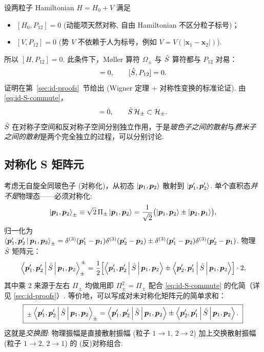 设两粒子 Hamiltonian $H=H_0+V$ 满足
\begin{itemize}
  \item $[H_0,P_{12}]=0$ (动能项天然对称, 自由 Hamiltonian 不区分粒子标号)；
  \item $[V,P_{12}]=0$ (势 $V$ 不依赖于人为标号，例如 $V=V(|\bm x_1-\bm x_2|)$).
\end{itemize}
所以 $[H,P_{12}]=0$. 此条件下，Møller 算符 $\Omega_\pm$ 与 $\hat{S}$ 算符都与 $P_{12}$ 对易：
\begin{equation}
  [\Omega_\pm,P_{12}]=0,\qquad [\Smat,P_{12}]=0.
  \label{eq:id-S-commute}
\end{equation}
证明在第~\ref{sec:id-proofs}~节给出 (Wigner 定理 + 对称性变换的标准论证). 由 \eqref{eq:id-S-commute}，
\begin{equation}
  [\Smat,\Pi_\pm]=0,\qquad
  \Smat\,\Hilb_\pm\subset\Hilb_\pm.
  \label{eq:id-S-invariant}
\end{equation}
$\hat{S}$ 在对称子空间和反对称子空间分别独立作用，于是\emph{玻色子之间的散射}与\emph{费米子之间的散射}是两个完全独立的过程，可以分别讨论.

\subsection{对称化 S 矩阵元}\label{sec:id-sym-S}

考虑无自旋全同玻色子 (对称化)，从初态 $\ket{\bm p_1,\bm p_2}$ 散射到 $\ket{\bm p_1',\bm p_2'}$. 单个直积态\emph{并不是}物理态——必须对称化:
\begin{equation}
  \ket{\bm p_1,\bm p_2}_\pm\equiv\sqrt{2}\,\Pi_\pm\ket{\bm p_1,\bm p_2}
  =\frac{1}{\sqrt 2}\bigl(\ket{\bm p_1,\bm p_2}\pm\ket{\bm p_2,\bm p_1}\bigr),
  \label{eq:id-bose-state}
\end{equation}
归一化为 $\left\langle \bm p_1',\bm p_2' \,\middle|\, \bm p_1,\bm p_2 \right\rangle_\pm=\delta^{(3)}(\bm p_1'-\bm p_1)\delta^{(3)}(\bm p_2'-\bm p_2)\pm\delta^{(3)}(\bm p_1'-\bm p_2)\delta^{(3)}(\bm p_2'-\bm p_1)$. 物理 $\hat{S}$ 矩阵元：
\begin{equation}
  \left\langle \bm p_1',\bm p_2' \,\middle|\, \hat{S} \,\middle|\, \bm p_1,\bm p_2 \right\rangle_\pm^{\,\pm}
  =\frac{1}{2}\Bigl[\left\langle \bm p_1',\bm p_2' \,\middle|\, \hat{S} \,\middle|\, \bm p_1,\bm p_2 \right\rangle\pm\left\langle \bm p_2',\bm p_1' \,\middle|\, \hat{S} \,\middle|\, \bm p_1,\bm p_2 \right\rangle\Bigr]\cdot 2,
  \label{eq:id-S-symmetrized}
\end{equation}
其中乘 $2$ 来源于左右 $\Pi_\pm$ 均做用即 $\Pi_\pm^2=\Pi_\pm$ 配合 \eqref{eq:id-S-commute} 的化简（详见 \ref{sec:id-proofs}）. 等价地，可以写成对未对称化矩阵元的简单求和：
\begin{equation}
  \boxed{\;_\pm\left\langle \bm p_1',\bm p_2' \,\middle|\, \hat{S} \,\middle|\, \bm p_1,\bm p_2 \right\rangle_\pm
  =\left\langle \bm p_1',\bm p_2' \,\middle|\, \hat{S} \,\middle|\, \bm p_1,\bm p_2 \right\rangle\pm\left\langle \bm p_2',\bm p_1' \,\middle|\, \hat{S} \,\middle|\, \bm p_1,\bm p_2 \right\rangle.\;}
  \label{eq:id-S-pm-formula}
\end{equation}
这就是\emph{交换图}: 物理振幅是直接散射振幅 (粒子 $1\to 1$, $2\to 2$) 加上交换散射振幅 (粒子 $1\to 2$, $2\to 1$) 的 (反)对称组合.

